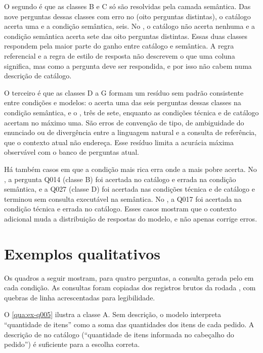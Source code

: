 O segundo é que as classes B e C só são resolvidas pela camada semântica. Das
nove perguntas dessas classes com erro no  (oito
perguntas distintas), o catálogo acerta uma e a condição semântica, seis.
No , o catálogo não acerta nenhuma e a condição semântica
acerta sete das oito perguntas distintas. Essas duas classes respondem pela
maior parte do ganho entre catálogo e semântica. A regra referencial e a
regra de estilo de resposta não descrevem o que uma coluna significa, mas
como a pergunta deve ser respondida, e por isso não cabem numa descrição
de catálogo.

O terceiro é que as classes D a G formam um resíduo sem padrão consistente
entre condições e modelos: o  acerta uma das seis
perguntas dessas classes na condição semântica, e o ,
três de sete, enquanto as condições técnica e de catálogo acertam no
máximo uma. São erros de convenção de tipo, de
ambiguidade do enunciado ou de divergência entre a linguagem natural e a
consulta de referência, que o contexto atual não endereça. Esse resíduo
limita a acurácia máxima observável com o banco de perguntas atual.

Há também casos em que a condição mais rica erra onde a mais pobre acerta.
No , a pergunta Q014 (classe B) foi acertada no catálogo
e errada na condição semântica, e a Q027 (classe D) foi acertada nas
condições técnica e de catálogo e terminou sem consulta executável na
semântica. No , a Q017 foi acertada na condição técnica e
errada no catálogo. Esses casos mostram que o contexto adicional muda a
distribuição de respostas do modelo, e não apenas corrige erros.

\section{Exemplos qualitativos}
\label{sec:exemplos}

Os quadros a seguir mostram, para quatro perguntas, a consulta gerada pelo
 em cada condição. As consultas foram copiadas dos
registros brutos da rodada , com quebras de linha
acrescentadas para legibilidade.

O \autoref{qua:ex-q005} ilustra a classe A. Sem descrição, o modelo
interpreta ``quantidade de itens'' como a soma das quantidades dos itens
de cada pedido. A descrição de  no catálogo
(``quantidade de itens informada no cabeçalho do pedido'') é suficiente
para a escolha correta.

